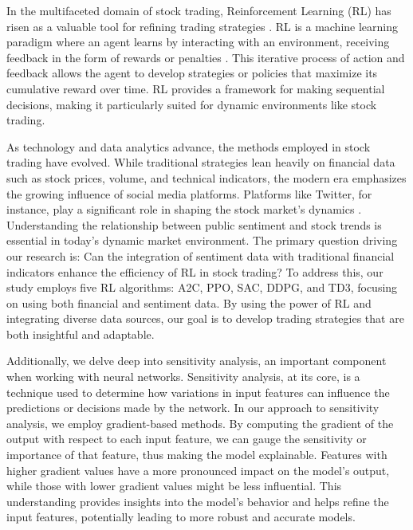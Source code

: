 \documentclass[12pt]{article}
\begin{document}
In the multifaceted domain of stock trading, Reinforcement Learning (RL) has risen as a valuable tool for refining trading strategies \cite{RLforFinance}. RL is a machine learning paradigm where an agent learns by interacting with an environment, receiving feedback in the form of rewards or penalties \cite{SuttonBarto1998}. This iterative process of action and feedback allows the agent to develop strategies or policies that maximize its cumulative reward over time. RL provides a framework for making sequential decisions, making it particularly suited for dynamic environments like stock trading.

As technology and data analytics advance, the methods employed in stock trading have evolved. While traditional strategies lean heavily on financial data such as stock prices, volume, and technical indicators, the modern era emphasizes the growing influence of social media platforms. Platforms like Twitter, for instance, play a significant role in shaping the stock market's dynamics \cite{SocialMedia_stockmarket}. Understanding the relationship between public sentiment and stock trends is essential in today's dynamic market environment. The primary question driving our research is: Can the integration of sentiment data with traditional financial indicators enhance the efficiency of RL in stock trading? To address this, our study employs five RL algorithms: A2C, PPO, SAC, DDPG, and TD3, focusing on using both financial and sentiment data. By using the power of RL and integrating diverse data sources, our goal is to develop trading strategies that are both insightful and adaptable.

Additionally, we delve deep into sensitivity analysis, an important component when working with neural networks. Sensitivity analysis, at its core, is a technique used to determine how variations in input features can influence the predictions or decisions made by the network. In our approach to sensitivity analysis, we employ gradient-based methods. By computing the gradient of the output with respect to each input feature, we can gauge the sensitivity or importance of that feature, thus making the model explainable. Features with higher gradient values have a more pronounced impact on the model's output, while those with lower gradient values might be less influential. This understanding provides insights into the model's behavior and helps refine the input features, potentially leading to more robust and accurate models. 
\end{document}
